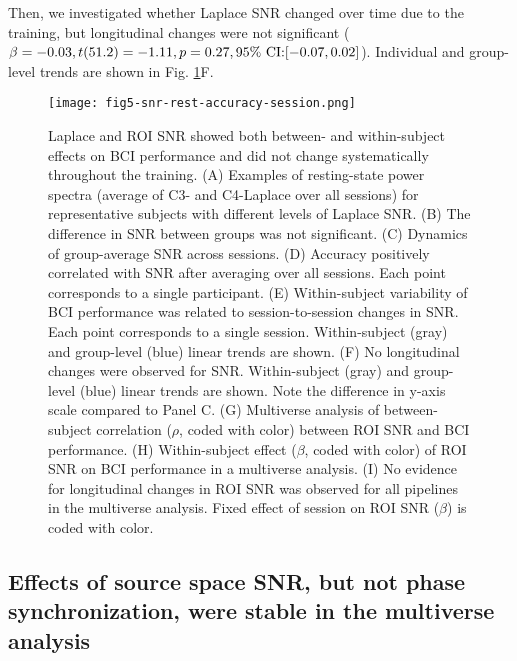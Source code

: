 Then, we investigated whether Laplace SNR changed over time due to the training, but longitudinal changes were not significant ($\beta = -0.03, t(51.2) = -1.11, p = 0.27, 95\%~\text{CI:}\allowbreak[-0.07, 0.02]$). Individual and group-level trends are shown in Fig. \ref{fig:snr_vs_accuracy_session_combined}F.

\begin{figure}[htbp]
    \centering
    \texttt{[image: fig5-snr-rest-accuracy-session.png]}
    \caption{Laplace and ROI SNR showed both between- and within-subject effects on BCI performance and did not change systematically throughout the training. (A) Examples of resting-state power spectra (average of C3- and C4-Laplace over all sessions) for representative subjects with different levels of Laplace SNR. (B) The difference in SNR between groups was not significant. (C) Dynamics of group-average SNR across sessions. (D) Accuracy positively correlated with SNR after averaging over all sessions. Each point corresponds to a single participant. (E) Within-subject variability of BCI performance was related to session-to-session changes in SNR. Each point corresponds to a single session. Within-subject (gray) and group-level (blue) linear trends are shown. (F) No longitudinal changes were observed for SNR. Within-subject (gray) and group-level (blue) linear trends are shown. Note the difference in y-axis scale compared to Panel C. (G) Multiverse analysis of between-subject correlation ($\rho$, coded with color) between ROI SNR and BCI performance. (H) Within-subject effect ($\beta$, coded with color) of ROI SNR on BCI performance in a multiverse analysis. (I) No evidence for longitudinal changes in ROI SNR was observed for all pipelines in the multiverse analysis. Fixed effect of session on ROI SNR ($\beta$) is coded with color.}
    \label{fig:snr_vs_accuracy_session_combined}
\end{figure}

\subsection{Effects of source space SNR, but not phase synchronization, were stable in the multiverse analysis}

